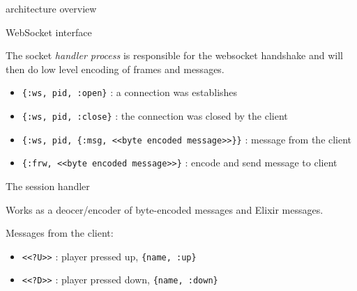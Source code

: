 \begin{frame}{architecture overview}
\begin{figure}

\end{figure}
\end{frame}


\begin{frame}{WebSocket interface}

  The socket {\em handler process} is responsible for the websocket
  handshake and will then do low level encoding of frames and
  messages.  

\vspace{10pt}  \pause

\begin{itemize}
\item {\tt \{:ws, pid, :open\}}  : a connection was establishes
\item {\tt \{:ws, pid, :close\}}  : the connection was closed by the client
\item {\tt \{:ws, pid, \{:msg,  <<byte encoded message>>\}\}} : message from the client
\end{itemize}

\vspace{10pt}  \pause

\begin{itemize}
\item {\tt \{:frw, <<byte encoded message>>\}}  : encode and send message to client
\end{itemize}

\end{frame}

\begin{frame}{The session handler}

  Works as a deocer/encoder of byte-encoded  messages and Elixir messages.

\vspace{20pt}  \pause

Messages from the client:

\vspace{20pt}

      \begin{itemize}
      \item {\tt <<?U>>}  : player pressed up, {\tt \{name, :up\}}
      \item {\tt <<?D>>}  : player pressed down, {\tt \{name, :down\}}        
      \end{itemize}


\end{frame}

